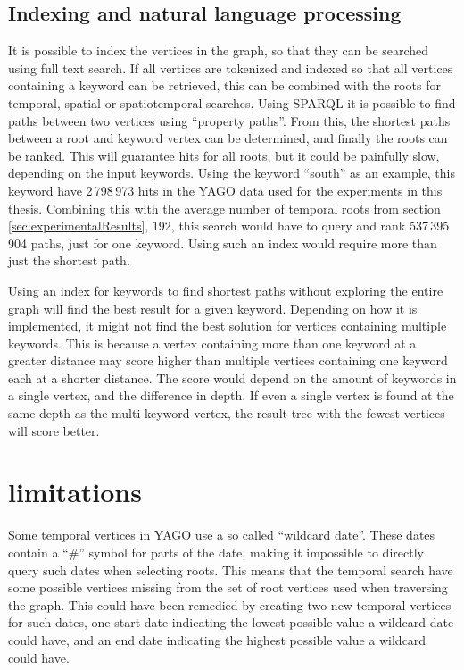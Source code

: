 \subsection{Indexing and natural language processing}
It is possible to index the vertices in the graph, so that they can be searched using full text search. If all vertices are tokenized and indexed so that all vertices containing a keyword can be retrieved, this can be combined with the roots for temporal, spatial or spatiotemporal searches. Using SPARQL it is possible to find paths between two vertices using ``property paths''. From this, the shortest paths between a root and keyword vertex can be determined, and finally the roots can be ranked. This will guarantee hits for all roots, but it could be painfully slow, depending on the input keywords. Using the keyword ``south'' as an example, this keyword have 2\,798\,973 hits in the YAGO data used for the experiments in this thesis. Combining this with the average number of temporal roots from section \ref{sec:experimentalResults}, 192, this search would have to query and rank 537\,395\,904 paths, just for one keyword. Using such an index would require more than just the shortest path.

Using an index for keywords to find shortest paths without exploring the entire graph will find the best result for a given keyword. Depending on how it is implemented, it might not find the best solution for vertices containing multiple keywords. This is because a vertex containing more than one keyword at a greater distance may score higher than multiple vertices containing one keyword each at a shorter distance. The score would depend on the amount of keywords in a single vertex, and the difference in depth. If even a single vertex is found at the same depth as the multi-keyword vertex, the result tree with the fewest vertices will score better.

\section{limitations}
% 
Some temporal vertices in YAGO use a so called ``wildcard date''. These dates contain a ``\#'' symbol for parts of the date, making it impossible to directly query such dates when selecting roots. This means that the temporal search have some possible vertices missing from the set of root vertices used when traversing the graph. This could have been remedied by creating two new temporal vertices for such dates, one start date indicating the lowest possible value a wildcard date could have, and an end date indicating the highest possible value a wildcard could have.

